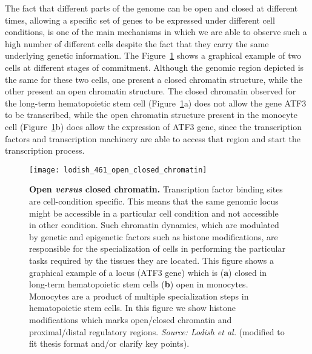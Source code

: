 The fact that different parts of the genome can be open and closed at different times, allowing a specific set of genes to be expressed under different cell conditions, is one of the main mechanisms in which we are able to observe such a high number of different cells despite the fact that they carry the same underlying genetic information. The Figure~\ref{fig:lodish_open_closed_chromatin} shows a graphical example of two cells at different stages of commitment. Although the genomic region depicted is the same for these two cells, one present a closed chromatin structure, while the other present an open chromatin structure. The closed chromatin observed for the long-term hematopoietic stem cell (Figure~\ref{fig:lodish_open_closed_chromatin}a) does not allow the gene ATF3 to be transcribed, while the open chromatin structure present in the monocyte cell (Figure~\ref{fig:lodish_open_closed_chromatin}b) does allow the expression of ATF3 gene, since the transcription factors and transcription machinery are able to access that region and start the transcription process.

\begin{figure}[h!]
\centering
\texttt{[image: lodish\_461\_open\_closed\_chromatin]}
\caption[Open \emph{versus} closed chromatin]{\textbf{Open \emph{versus} closed chromatin.} Transription factor binding sites are cell-condition specific. This means that the same genomic locus might be accessible in a particular cell condition and not accessible in other condition. Such chromatin dynamics, which are modulated by genetic and epigenetic factors such as histone modifications, are responsible for the specialization of cells in performing the particular tasks required by the tissues they are located. This figure shows a graphical example of a locus (ATF3 gene) which is (\textbf{a}) closed in long-term hematopoietic stem cells (\textbf{b}) open in monocytes. Monocytes are a product of multiple specialization steps in hematopoietic stem cells. In this figure we show histone modifications which marks open/closed chromatin and proximal/distal regulatory regions. \emph{Source: Lodish et al.}\cite{lodish2007} (modified to fit thesis format and/or clarify key points).}
\label{fig:lodish_open_closed_chromatin}
\end{figure}

